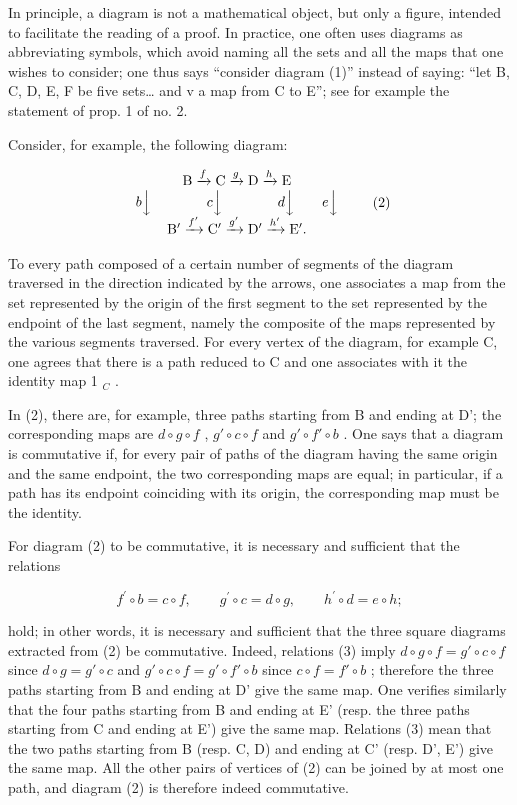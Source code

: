 In principle, a diagram is not a mathematical object, but only a figure, intended to facilitate the reading of a proof. In practice, one often uses diagrams as abbreviating symbols, which avoid naming all the sets and all the maps that one wishes to consider; one thus says “consider diagram (1)” instead of saying: “let B, C, D, E, F be five sets\ldots{} and v a map from C to E”; see for example the statement of prop. 1 of no. 2.

Consider, for example, the following diagram:

\[
\begin{array}{c} \mathrm{B} \xrightarrow {f} \mathrm{C} \xrightarrow {g} \mathrm{D} \xrightarrow {h} \mathrm{E} \\ b \Big \downarrow \qquad \qquad c \Big \downarrow \qquad \qquad d \Big \downarrow \qquad e \Big \downarrow \\ \mathrm{B} ^ {\prime} \xrightarrow {f ^ {\prime}} \mathrm{C} ^ {\prime} \xrightarrow {g ^ {\prime}} \mathrm{D} ^ {\prime} \xrightarrow {h ^ {\prime}} \mathrm{E} ^ {\prime}. \end{array}\tag{2}
\]

To every path composed of a certain number of segments of the diagram traversed in the direction indicated by the arrows, one associates a map from the set represented by the origin of the first segment to the set represented by the endpoint of the last segment, namely the composite of the maps represented by the various segments traversed. For every vertex of the diagram, for example C, one agrees that there is a path reduced to C and one associates with it the identity map 1 \(_{C}\) .

In (2), there are, for example, three paths starting from B and ending at D'; the corresponding maps are \(d \circ g \circ f\) , \(g' \circ c \circ f\) and \(g' \circ f' \circ b\) . One says that a diagram is commutative if, for every pair of paths of the diagram having the same origin and the same endpoint, the two corresponding maps are equal; in particular, if a path has its endpoint coinciding with its origin, the corresponding map must be the identity.

For diagram (2) to be commutative, it is necessary and sufficient that the relations

\[
f ^ {\prime} \circ b = c \circ f, \qquad g ^ {\prime} \circ c = d \circ g, \qquad h ^ {\prime} \circ d = e \circ h;\tag{3}
\]

hold; in other words, it is necessary and sufficient that the three square diagrams extracted from (2) be commutative. Indeed, relations (3) imply \(d \circ g \circ f = g' \circ c \circ f\) since \(d \circ g = g' \circ c\) and \(g' \circ c \circ f = g' \circ f' \circ b\) since \(c \circ f = f' \circ b\) ; therefore the three paths starting from B and ending at D' give the same map. One verifies similarly that the four paths starting from B and ending at E' (resp. the three paths starting from C and ending at E') give the same map. Relations (3) mean that the two paths starting from B (resp. C, D) and ending at C' (resp. D', E') give the same map. All the other pairs of vertices of (2) can be joined by at most one path, and diagram (2) is therefore indeed commutative.

